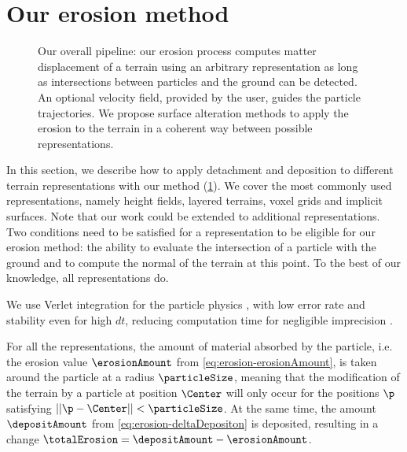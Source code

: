 \section{Our erosion method}
\label{sec:erosion-application_on_representations}


\begin{figure}
    \caption{Our overall pipeline: our erosion process computes matter displacement of a terrain using an arbitrary representation as long as intersections between particles and the ground can be detected. An optional velocity field, provided by the user, guides the particle trajectories. We propose surface alteration methods to apply the erosion to the terrain in a coherent way between possible representations.}
    \label{fig:erosion-figure_pipeline}
\end{figure}

In this section, we describe how to apply detachment and deposition to different terrain representations with our method (\cref{fig:erosion-figure_pipeline}). We cover the most commonly used representations, namely height fields, layered terrains, voxel grids and implicit surfaces. Note that our work could be extended to additional representations. Two conditions need to be satisfied for a representation to be eligible for our erosion method: the ability to evaluate the intersection of a particle with the ground and to compute the normal of the terrain at this point. To the best of our knowledge, all representations do.

We use Verlet integration for the particle physics \cite{Verlet1967}, with low error rate and stability even for high $dt$, reducing computation time for negligible imprecision \cite{Baraff1998, Swope1982}.

For all the representations, the amount of material absorbed by the particle, i.e. the erosion value $\erosionAmount$ from \cref{eq:erosion-erosionAmount}, is taken around the particle at a radius $\particleSize$, meaning that the modification of the terrain by a particle at position $\Center$ will only occur for the positions $\p$ satisfying $||\p - \Center|| < \particleSize$. At the same time, the amount $\depositAmount$ from \cref{eq:erosion-deltaDepositon} is deposited, resulting in a change $\totalErosion = \depositAmount - \erosionAmount$.

